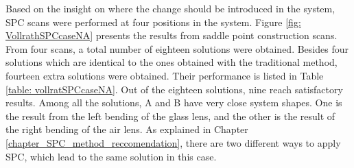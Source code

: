 Based on the insight on where the change should be introduced in the system, SPC scans were performed at four positions in the system. Figure \ref{fig: VollrathSPCcaseNA} presents the results from saddle point construction scans. From four scans, a total number of eighteen solutions were obtained. Besides four solutions which are identical to the ones obtained with the traditional method, fourteen extra solutions were obtained. Their performance is listed in Table \ref{table: vollratSPCcaseNA}. Out of the eighteen solutions, nine reach satisfactory results. Among all the solutions, A and B have very close system shapes. One is the result from the left bending of the glass lens, and the other is the result of the right bending of the air lens. As explained in Chapter \ref{chapter_SPC_method_reccomendation}, there are two different ways to apply SPC, which lead to the same solution in this case.

\begin{figure}
\end{figure}


